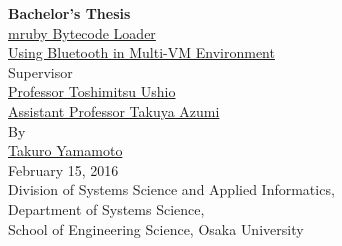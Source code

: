 \documentclass[a4j,12pt,oneside,openany,english]{jsbook}
\begin{document}
\thispagestyle{empty}
\begin{center}
\vspace*{5mm}
{\Huge {\bf Bachelor's Thesis}}\\
\vspace{2cm}
\underline{\LARGE{mruby Bytecode Loader}} \\
\vspace{0.5cm}
\underline{\Large{Using Bluetooth in Multi-VM Environment}} \\
\vspace{12mm}
{\large Supervisor}\\
\vspace{6mm}
\underline{\Large Professor Toshimitsu Ushio}\\
\underline{\Large Assistant Professor Takuya Azumi}\\
\vspace{8mm}
{\large By}\\
\vspace{6mm}
\underline{\Large Takuro Yamamoto}\\
\vspace{10mm}
{\Large February 15, 2016}\\
\vspace{14mm}
{\Large Division of Systems Science and Applied Informatics,\\Department of Systems Science,\\School of Engineering Science, Osaka University}\\
\end{center}
\clearpage
\setcounter{page}{0}
\end{document}
